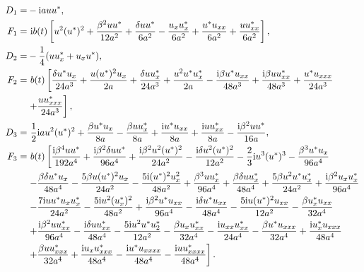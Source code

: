 \documentclass[12pt]{article}
\begin{document}
\begin{align}
  D_{1} =& -\mathrm{i}auu^{*}, \\
  F_{1} =&\ \mathrm{i}b(t) \left[ u^{2}(u^{*})^{2} + \frac{\beta^{2}uu^{*}}{12a^{2}} + \frac{\delta uu^{*}}{6a^{2}} - \frac{u_{x}u^{*}_{x}}{6a^{2}} + \frac{u^{*}u_{xx}}{6a^{2}} + \frac{uu^{*}_{xx}}{6a^{2}} \right], \\
  D_{2} =& -\frac{1}{4}(uu^{*}_{x} + u_{x}u^{*}), \\
  F_{2} =&\ b(t) \left[\frac{\delta u^{*}u_{x}}{24a^{3}} + \frac{u(u^{*})^{2}u_{x}}{2a} + \frac{\delta uu^{*}_{x}}{24a^{3}} + \frac{u^{2}u^{*}u^{*}_{x}}{2a} - \frac{\mathrm{i}\beta u^{*}u_{xx}}{48a^{3}} + \frac{\mathrm{i}\beta uu^{*}_{xx}}{48a^{3}} + \frac{u^{*}u_{xxx}}{24a^{3}} \right. \notag\\
  & \left. + \frac{uu^{*}_{xxx}}{24a^{3}} \right], \\
  D_{3} =&\ \frac{1}{2}\mathrm{i}au^{2}(u^{*})^{2} + \frac{\beta u^{*}u_{x}}{8a} - \frac{\beta uu^{*}_{x}}{8a} + \frac{\mathrm{i}u^{*}u_{xx}}{8a} + \frac{\mathrm{i}uu^{*}_{xx}}{8a} - \frac{\mathrm{i}\beta^{2}uu^{*}}{16a}, \\
  F_{3} =&\ b(t) \left[\frac{\mathrm{i}\beta^{4}uu^{*}}{192a^{4}} + \frac{\mathrm{i}\beta^{2}\delta uu^{*}}{96a^{4}} + \frac{\mathrm{i}\beta^{2}u^{2}(u^{*})^{2}}{24a^{2}} - \frac{\mathrm{i}\delta u^{2}(u^{*})^{2}}{12a^{2}} - \frac{2}{3}\mathrm{i}u^{3}(u^{*})^{3} - \frac{\beta^{3}u^{*}u_{x}}{96a^{4}}  \right. \notag\\
  & \left. - \frac{\beta\delta u^{*}u_{x}}{48a^{4}} - \frac{5\beta u(u^{*})^{2}u_{x}}{24a^{2}} - \frac{5\mathrm{i}(u^{*})^{2}u_{x}^{2}}{48a^{2}} + \frac{\beta^{3}uu^{*}_{x}}{96a^{4}} + \frac{\beta\delta uu^{*}_{x}}{48a^{4}} + \frac{5\beta u^{2}u^{*}u^{*}_{x}}{24a^{2}} + \frac{\mathrm{i}\beta^{2}u_{x}u^{*}_{x}}{96a^{4}} \right. \notag\\
  & \left. - \frac{7\mathrm{i}uu^{*}u_{x}u^{*}_{x}}{24a^{2}} - \frac{5\mathrm{i}u^{2}(u^{*}_{x})^{2}}{48a^{2}} + \frac{\mathrm{i}\beta^{2}u^{*}u_{xx}}{96a^{4}} - \frac{\mathrm{i}\delta u^{*}u_{xx}}{48a^{4}} - \frac{5\mathrm{i}u(u^{*})^{2}u_{xx}}{12a^{2}} - \frac{\beta u^{*}_{x}u_{xx}}{32a^{4}} \right. \notag\\
  & \left.  + \frac{\mathrm{i}\beta^{2}uu^{*}_{xx}}{96a^{4}} - \frac{\mathrm{i}\delta uu^{*}_{xx}}{48a^{4}} - \frac{5\mathrm{i}u^{2}u^{*}u^{*}_{2}}{12a^{2}} - \frac{\beta u_{x}u^{*}_{xx}}{32a^{4}} - \frac{\mathrm{i}u_{xx}u^{*}_{xx}}{24a^{4}} - \frac{\beta u^{*}u_{xxx}}{32a^{4}} + \frac{\mathrm{i}u^{*}_{x}u_{xxx}}{48a^{4}} \right. \notag\\
  & \left. + \frac{\beta uu^{*}_{xxx}}{32a^{4}} + \frac{\mathrm{i}u_{x}u^{*}_{xxx}}{48a^{4}} - \frac{\mathrm{i}u^{*}u_{xxxx}}{48a^{4}} - \frac{\mathrm{i}uu^{*}_{xxxx}}{48a^{4}}\right].
\end{align}
\end{document}
